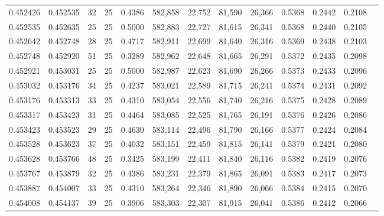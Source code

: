 \begin{tabular}{rrrrrrrrrrrrr}
0.452426 & 0.452535 &    32 &  25 &                                     0.4386 & 582,858 &  22,752 &  81,590 &  26,366 & 0.5368 & 0.2442 & 0.2108 \\
0.452535 & 0.452635 &    25 &  25 &                                     0.5000 & 582,883 &  22,727 &  81,615 &  26,341 & 0.5368 & 0.2440 & 0.2105 \\
0.452642 & 0.452748 &    28 &  25 &                                     0.4717 & 582,911 &  22,699 &  81,640 &  26,316 & 0.5369 & 0.2438 & 0.2103 \\
0.452748 & 0.452920 &    51 &  25 &                                     0.3289 & 582,962 &  22,648 &  81,665 &  26,291 & 0.5372 & 0.2435 & 0.2098 \\
0.452921 & 0.453031 &    25 &  25 &                                     0.5000 & 582,987 &  22,623 &  81,690 &  26,266 & 0.5373 & 0.2433 & 0.2096 \\
0.453032 & 0.453176 &    34 &  25 &                                     0.4237 & 583,021 &  22,589 &  81,715 &  26,241 & 0.5374 & 0.2431 & 0.2092 \\
0.453176 & 0.453313 &    33 &  25 &                                     0.4310 & 583,054 &  22,556 &  81,740 &  26,216 & 0.5375 & 0.2428 & 0.2089 \\
0.453317 & 0.453423 &    31 &  25 &                                     0.4464 & 583,085 &  22,525 &  81,765 &  26,191 & 0.5376 & 0.2426 & 0.2086 \\
0.453423 & 0.453523 &    29 &  25 &                                     0.4630 & 583,114 &  22,496 &  81,790 &  26,166 & 0.5377 & 0.2424 & 0.2084 \\
0.453528 & 0.453623 &    37 &  25 &                                     0.4032 & 583,151 &  22,459 &  81,815 &  26,141 & 0.5379 & 0.2421 & 0.2080 \\
0.453628 & 0.453766 &    48 &  25 &                                     0.3425 & 583,199 &  22,411 &  81,840 &  26,116 & 0.5382 & 0.2419 & 0.2076 \\
0.453767 & 0.453879 &    32 &  25 &                                     0.4386 & 583,231 &  22,379 &  81,865 &  26,091 & 0.5383 & 0.2417 & 0.2073 \\
0.453887 & 0.454007 &    33 &  25 &                                     0.4310 & 583,264 &  22,346 &  81,890 &  26,066 & 0.5384 & 0.2415 & 0.2070 \\
0.454008 & 0.454137 &    39 &  25 &                                     0.3906 & 583,303 &  22,307 &  81,915 &  26,041 & 0.5386 & 0.2412 & 0.2066 \\

\end{tabular}
